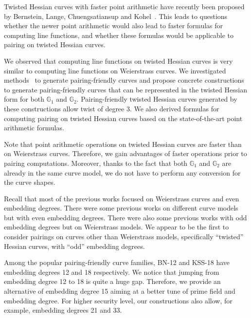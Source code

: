 Twisted Hessian curves with faster point arithmetic have recently been proposed by
Bernstein, Lange, Chuengsatiansup and Kohel~\cite{2015/hessian}.
This leads to questions whether the newer point arithmetic would also lead to faster formulas for computing line functions,
and whether these formulas would be applicable to pairing on twisted Hessian curves.

We observed that computing line functions on twisted Hessian curves is very similar to computing line functions on Weierstrass curves.
We investigated methods~\cite{2010/freeman} to generate pairing-friendly curves
and propose concrete constructions to generate pairing-friendly curves
that can be represented in the twisted Hessian form for both $\mathbb{G}_1$ and $\mathbb{G}_2$.
Pairing-friendly twisted Hessian curves generated by these constructions allow twist of degree 3.
We also derived formulas for computing pairing on twisted Hessian curves based on the state-of-the-art point arithmetic formulas.

Note that point arithmetic operations on twisted Hessian curves are faster than on Weierstrass curves.
Therefore, we gain advantages of faster operations prior to pairing computations.
Moreover, thanks to the fact that both $\mathbb{G}_1$ and $\mathbb{G}_2$ are already in the same curve model,
we do not have to perform any conversion for the curve shapes.

Recall that most of the previous works focused on Weierstrass curves and even embedding degrees.
There were some previous works on different curve models but with even embedding degrees.
There were also some previous works with odd embedding degrees but on Weierstrass models.
We appear to be the first to consider pairings on curves other than Weierstrass models,
specifically ``twisted'' Hessian curves, with ``odd'' embedding degrees.

Among the popular pairing-friendly curve families,
BN-12 and KSS-18 have embedding degrees 12 and 18 respectively.
We notice that jumping from embedding degree 12 to 18 is quite a huge gap.
Therefore, we provide an alternative of embedding degree 15 aiming at a better tune of prime field and embedding degree.
For higher security level, our constructions also allow, for example, embedding degrees 21 and 33.


%
%

%
